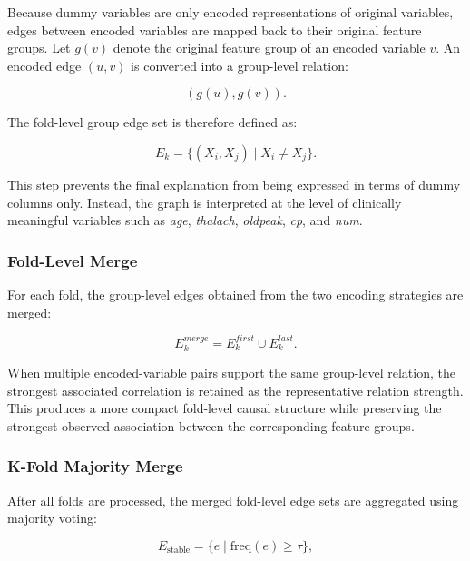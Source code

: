 \documentclass[conference, a4paper]{IEEEtran}
\begin{document}
Because dummy variables are only encoded representations of original variables, edges between encoded variables are mapped back to their original feature groups. Let $g(v)$ denote the original feature group of an encoded variable $v$. An encoded edge $(u,v)$ is converted into a group-level relation:

\begin{equation}
(g(u), g(v)).
\end{equation}

The fold-level group edge set is therefore defined as:

\begin{equation}
E_k = \{(X_i, X_j) \mid X_i \neq X_j\}.
\end{equation}

This step prevents the final explanation from being expressed in terms of dummy columns only. Instead, the graph is interpreted at the level of clinically meaningful variables such as \textit{age}, \textit{thalach}, \textit{oldpeak}, \textit{cp}, and \textit{num}.

\subsubsection{Fold-Level Merge}

For each fold, the group-level edges obtained from the two encoding strategies are merged:

\begin{equation}
E_k^{merge} = E_k^{first} \cup E_k^{last}.
\end{equation}

When multiple encoded-variable pairs support the same group-level relation, the strongest associated correlation is retained as the representative relation strength. This produces a more compact fold-level causal structure while preserving the strongest observed association between the corresponding feature groups.

\subsubsection{K-Fold Majority Merge}

After all folds are processed, the merged fold-level edge sets are aggregated using majority voting:

\begin{equation}
E_{\text{stable}} =
\{e \mid \text{freq}(e) \geq \tau\},
\end{equation}
\end{document}
